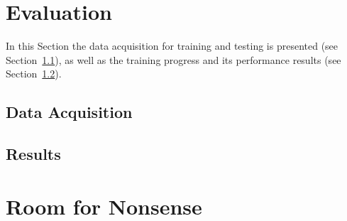 \documentclass[a4paper,11pt]{article}
\begin{document}
\section{Evaluation}
\label{sec:evaluation}
In this Section the data acquisition for training and testing is presented (see Section~\ref{sec:evaluation:data}), as well as the training progress and its performance results (see Section~\ref{sec:evaluation:results}).


\subsection{Data Acquisition}
\label{sec:evaluation:data}


\subsection{Results}
\label{sec:evaluation:results}


\section{Room for Nonsense}
\label{sec:nonsense}


\newpage
\printbibliography
\end{document}

